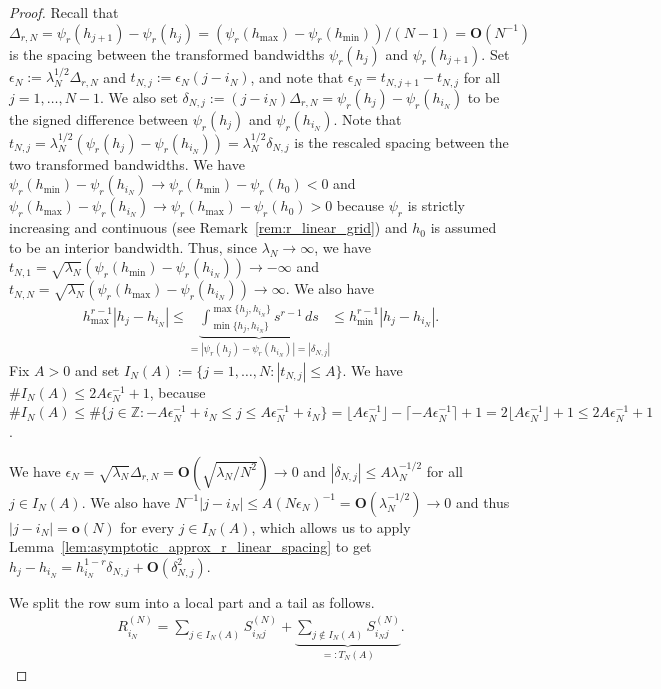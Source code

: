 \begin{proof}
    Recall that $\Delta_{r,N}=\psi_r(h_{j+1})-\psi_r(h_j)=(\psi_r(h_{\max})-\psi_r(h_{\min}))/(N-1)=\mathbf{O}(N^{-1})$ is the spacing between the transformed bandwidths $\psi_r(h_j)$ and $\psi_r(h_{j+1})$. Set $\epsilon_N:=\lambda_N^{1/2}\Delta_{r,N}$ and $t_{N,j}:=\epsilon_N(j-i_N)$, and note that $\epsilon_N=t_{N,j+1}-t_{N,j}$ for all $j=1,\dots,N-1$. We also set $\delta_{N,j}:=(j-i_N)\Delta_{r,N}=\psi_r(h_j)-\psi_r(h_{i_N})$ to be the signed difference between $\psi_r(h_j)$ and $\psi_r(h_{i_N})$. Note that $t_{N,j}=\lambda_N^{1/2}(\psi_r(h_j)-\psi_r(h_{i_N}))=\lambda_N^{1/2}\delta_{N,j}$ is the rescaled spacing between the two transformed bandwidths. We have $\psi_r(h_{\min})-\psi_r(h_{i_N})\to\psi_r(h_{\min})-\psi_r(h_0)<0$ and $\psi_r(h_{\max})-\psi_r(h_{i_N})\to \psi_r(h_{\max})-\psi_r(h_0)>0$ because $\psi_r$ is strictly increasing and continuous (see Remark~\ref{rem:r_linear_grid}) and $h_0$ is assumed to be an interior bandwidth. Thus, since $\lambda_N\to\infty$, we have $t_{N,1}=\sqrt{\lambda_N}(\psi_r(h_{\min})-\psi_r(h_{i_N}))\to-\infty$ and $t_{N,N}=\sqrt{\lambda_N}(\psi_r(h_{\max})-\psi_r(h_{i_N}))\to\infty$. We also have
    \begin{align}\label{eq:delta_N_j_lower_and_upper_bound}
        h_{\max}^{r-1}|h_j-h_{i_N}|\le\underbrace{\int_{\min\{h_j,h_{i_N}\}}^{\max\{h_j,h_{i_N}\}}s^{r-1}\,ds}_{=|\psi_r(h_j)-\psi_r(h_{i_N})|=|\delta_{N,j}|}\le h_{\min}^{r-1}|h_j-h_{i_N}|.
    \end{align}
    Fix $A>0$ and set $I_N(A):=\{j=1,\dots,N:|t_{N,j}|\le A\}$. We have $\#I_N(A)\le2A\epsilon_N^{-1}+1$, because $\#I_N(A)\le\#\{j\in\mathbb{Z}:-A\epsilon_N^{-1}+i_N\le j\le A\epsilon_N^{-1}+i_N\}=\lfloor A\epsilon_N^{-1}\rfloor-\lceil-A\epsilon_N^{-1}\rceil+1=2\lfloor A\epsilon_N^{-1}\rfloor+1\le 2A\epsilon_N^{-1}+1$.

    We have $\epsilon_N=\sqrt{\lambda_N}\Delta_{r,N}=\mathbf{O}(\sqrt{\lambda_N/N^2})\to0$ and $|\delta_{N,j}|\le A\lambda_N^{-1/2}$ for all $j\in I_N(A)$. We also have $N^{-1}|j-i_N|\le A(N\epsilon_N)^{-1}=\mathbf{O}(\lambda_N^{-1/2})\to0$ and thus $|j-i_N|=\mathbf{o}(N)$ for every $j\in I_N(A)$, which allows us to apply Lemma~\ref{lem:asymptotic_approx_r_linear_spacing} to get $h_j-h_{i_N}=h_{i_N}^{1-r}\delta_{N,j}+\mathbf{O}(\delta_{N,j}^2)$.

    We split the row sum into a local part and a tail as follows.
    \begin{align*}
        R_{i_N}^{(N)}=\sum_{j\in I_N(A)}S_{i_Nj}^{(N)}+\underbrace{\sum_{j\notin I_N(A)}S_{i_Nj}^{(N)}}_{=:T_N(A)}.
    \end{align*}


\end{proof}
